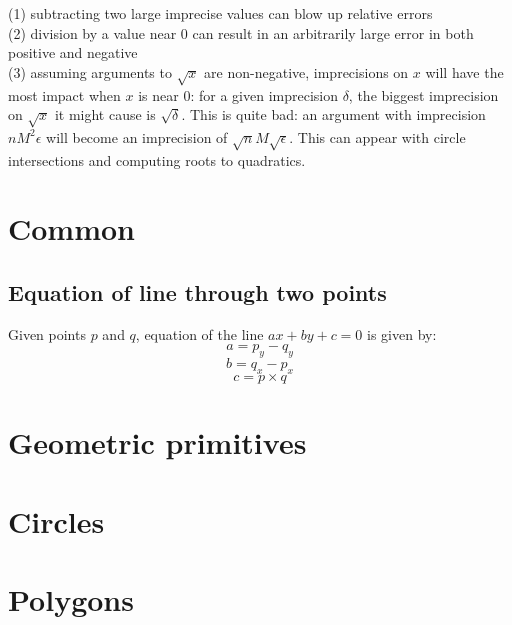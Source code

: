 	(1) subtracting two large imprecise values can blow up relative errors \\
	(2) division by a value near $0$ can result in an arbitrarily large error in both positive and negative \\
	(3) assuming arguments to $\sqrt{x}$ are non-negative, imprecisions on $x$ will have the most impact when $x$ is near $0$: for a given imprecision $\delta$, the biggest imprecision on $\sqrt{x}$ it might cause is $\sqrt{\delta}$. This is quite bad: an argument with imprecision $nM^2\epsilon$ will become an imprecision of $\sqrt{n}M\sqrt{\epsilon}$. This can appear with circle intersections and computing roots to quadratics. \\


\section{Common}
	\subsection{Equation of line through two points}
		Given points $p$ and $q$, equation of the line $ax + by + c = 0$ is given by:
		\small
		\[ a = p_y - q_y \]
		\[ b = q_x - p_x \]
		\[ c = p \times q \]
		\normalsize

\section{Geometric primitives}

\section{Circles}

\section{Polygons}

